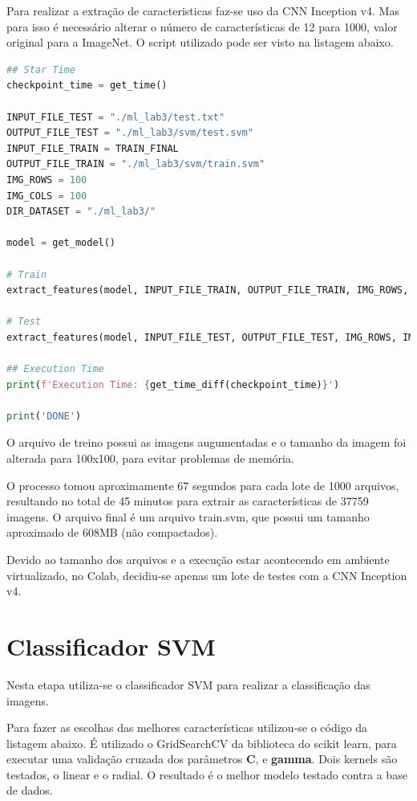 \documentclass[12pt,
	english,			%
	french,				%
	spanish,			%
	brazil,				%
	]{article}
\begin{document}
Para realizar a extração de caracteristicas faz-se uso da CNN Inception v4. Mas para isso é necessário alterar o número de características de 12 para 1000, valor original para a ImageNet. O script utilizado pode ser visto na listagem abaixo.

\begin{lstlisting}[caption={Código para extração de características},captionpos=b,frame=single,label={code:modelo_personalizado}, language=Python]
## Star Time
checkpoint_time = get_time()

INPUT_FILE_TEST = "./ml_lab3/test.txt"
OUTPUT_FILE_TEST = "./ml_lab3/svm/test.svm"
INPUT_FILE_TRAIN = TRAIN_FINAL
OUTPUT_FILE_TRAIN = "./ml_lab3/svm/train.svm"
IMG_ROWS = 100
IMG_COLS = 100
DIR_DATASET = "./ml_lab3/"

model = get_model()

# Train
extract_features(model, INPUT_FILE_TRAIN, OUTPUT_FILE_TRAIN, IMG_ROWS, IMG_COLS, DIR_DATASET)

# Test
extract_features(model, INPUT_FILE_TEST, OUTPUT_FILE_TEST, IMG_ROWS, IMG_COLS, DIR_DATASET)

## Execution Time
print(f'Execution Time: {get_time_diff(checkpoint_time)}')

print('DONE')
\end{lstlisting}

O arquivo de treino possui as imagens augumentadas e o tamanho da imagem foi alterada para 100x100, para evitar problemas de memória.

O processo tomou aproximamente 67 segundos para cada lote de 1000 arquivos, resultando no total de 45 minutos para extrair as características de 37759 imagens. O arquivo final é um arquivo train.svm, que possui um tamanho aproximado de 608MB (não compactados).

Devido ao tamanho dos arquivos e a execução estar acontecendo em ambiente virtualizado, no Colab, decidiu-se apenas um lote de testes com a CNN Inception v4.

\section{Classificador SVM}

Nesta etapa utiliza-se o classificador SVM para realizar a classificação das imagens.

Para fazer as escolhas das melhores características utilizou-se o código da listagem abaixo. É utilizado o GridSearchCV da biblioteca do scikit learn, para executar uma validação cruzada dos parâmetros \textbf{C}, e \textbf{gamma}. Dois kernels são testados, o linear e o radial. O resultado é o melhor modelo testado contra a base de dados.
\end{document}
